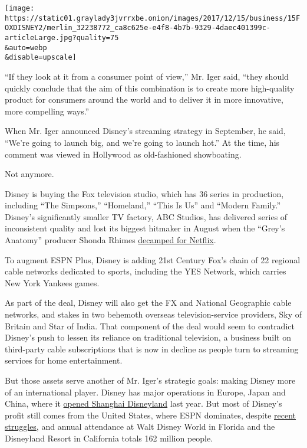 \texttt{[image: https://static01.graylady3jvrrxbe.onion/images/2017/12/15/business/15FOXDISNEY2/merlin\_32238772\_ca8c625e-e4f8-4b7b-9329-4daec401399c-articleLarge.jpg?quality=75\\\&auto=webp\\\&disable=upscale]}

``If they look at it from a consumer point of view,'' Mr. Iger said,
``they should quickly conclude that the aim of this combination is to
create more high-quality product for consumers around the world and to
deliver it in more innovative, more compelling ways.''

When Mr. Iger announced Disney's streaming strategy in September, he
said, ``We're going to launch big, and we're going to launch hot.'' At
the time, his comment was viewed in Hollywood as old-fashioned
showboating.

Not anymore.

Disney is buying the Fox television studio, which has 36 series in
production, including ``The Simpsons,'' ``Homeland,'' ``This Is Us'' and
``Modern Family.'' Disney's significantly smaller TV factory, ABC
Studios, has delivered series of inconsistent quality and lost its
biggest hitmaker in August when the ``Grey's Anatomy'' producer Shonda
Rhimes
\href{https://www.nytimes3xbfgragh.onion/2017/08/14/business/media/shonda-rhimes-netflix-deal.html?_r=0}{decamped
for Netflix}.

To augment ESPN Plus, Disney is adding 21st Century Fox's chain of 22
regional cable networks dedicated to sports, including the YES Network,
which carries New York Yankees games.

As part of the deal, Disney will also get the FX and National Geographic
cable networks, and stakes in two behemoth overseas television-service
providers, Sky of Britain and Star of India. That component of the deal
would seem to contradict Disney's push to lessen its reliance on
traditional television, a business built on third-party cable
subscriptions that is now in decline as people turn to streaming
services for home entertainment.

But those assets serve another of Mr. Iger's strategic goals: making
Disney more of an international player. Disney has major operations in
Europe, Japan and China, where it
\href{https://www.nytimes3xbfgragh.onion/2016/06/17/business/international/disney-shanghai-opens.html?_r=0}{opened
Shanghai Disneyland} last year. But most of Disney's profit still comes
from the United States, where ESPN dominates, despite
\href{https://www.nytimes3xbfgragh.onion/2017/11/09/business/media/disneys-earnings-star-wars.html}{recent
struggles}, and annual attendance at Walt Disney World in Florida and
the Disneyland Resort in California totals 162 million people.

